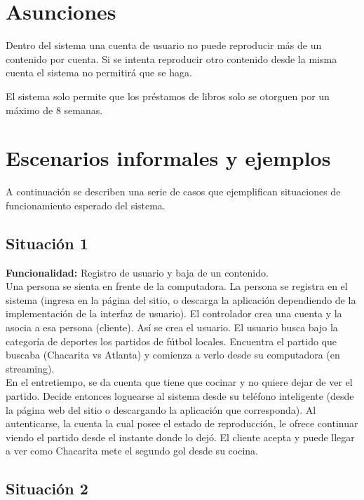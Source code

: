 \documentclass[11pt, a4paper, spanish]{article}
\begin{document}
\section{Asunciones}

	Dentro del sistema una cuenta de usuario no puede reproducir m\'as de un contenido por cuenta.
	Si se intenta reproducir otro contenido desde la misma cuenta el sistema no permitir\'a que se haga. 

	El sistema solo permite que los pr\'estamos de libros solo se otorguen por un m\'aximo de 8 semanas.

\newpage

\section{Escenarios informales y ejemplos}
	
	A continuaci\'on se describen una serie de casos que ejemplifican situaciones de funcionamiento esperado del sistema.

\subsection{Situaci\'on 1}

	\textbf{Funcionalidad:} Registro de usuario y baja de un contenido.\\

        Una persona se sienta en frente de la computadora.
    La persona se registra en el sistema (ingresa en la p\'agina del sitio, o descarga 
    la aplicaci\'on dependiendo de la implementaci\'on  de la interfaz de usuario).
    El controlador crea una cuenta y la asocia a esa persona (cliente). As\'i se crea el usuario.
    El usuario busca bajo la categor\'ia de deportes los partidos de f\'utbol locales.
    Encuentra el partido que buscaba (Chacarita vs Atlanta) y comienza a verlo desde su computadora (en streaming).\\

        En el entretiempo, se da cuenta que tiene que cocinar y no quiere dejar de ver el partido. Decide entonces loguearse al sistema desde su 
    tel\'efono inteligente (desde la p\'agina web del sitio o descargando la aplicaci\'on que corresponda). 
    Al autenticarse, la cuenta la cual posee el estado de reproducci\'on, le ofrece continuar viendo el partido desde el instante donde lo dej\'o.
    El cliente acepta y puede llegar a ver como Chacarita mete el segundo gol desde su cocina.

\subsection{Situaci\'on 2}
\end{document}
